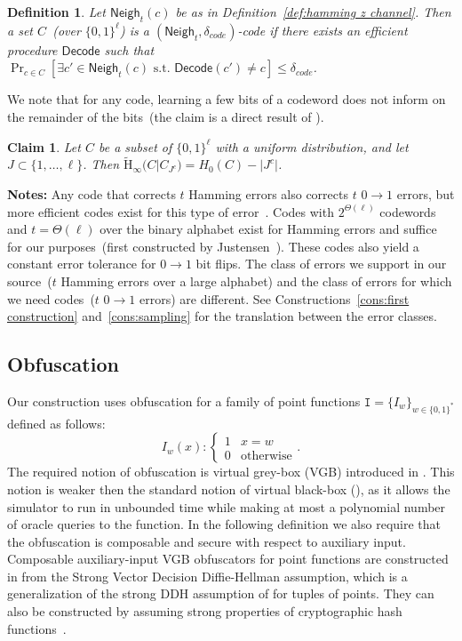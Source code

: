 \documentclass[11pt]{article}
\newcommand{\defref}[1]{\mbox{Definition~\ref{#1}}}
\newcommand{\class}[1]{{\ensuremath{\mathsf{#1}}}}
\newcommand{\zo}{\ensuremath{\{0, 1\}}}
\newcommand{\neigh}{\ensuremath{\class{Neigh}}\xspace}
\newcommand{\decode}{\ensuremath{\mathsf{Decode}}}
\newcommand{\Hav}{\tilde{\mathrm{H}}_\infty}
\newtheorem{definition}[theorem]{Definition}
\newtheorem{claim}[theorem]{Claim}
\begin{document}
\begin{definition}
Let $\neigh_t(c)$ be as in \defref{def:hamming z channel}.  Then a set $C$~(over $\zo^\ell$) is a $(\neigh_t, \delta_{code})$-code if there exists an efficient procedure $\decode$ such that $\Pr_{c\in C}[\exists c'\in \neigh_t(c) \text{ s.t. } \decode(c') \neq c] \leq \delta_{code}$.
\end{definition}

We note that for any code, learning a few bits of a codeword does not inform on the remainder of the bits~(the claim is a direct result of \cite[Lemma 2.2b]{DBLP:journals/siamcomp/DodisORS08}).

\begin{claim}
\label{cl:many locations ent}
Let $C$ be a subset of $\{0,1\}^\ell$ with a uniform distribution, and let $J\subset \{1,\dots,\ell\}$.  Then $\Hav(C | C_{J^c}) =  H_0(C) - |J^c|$.
\end{claim}

\textbf{Notes:}
Any code that corrects $t$ Hamming errors also corrects $t$ $0\rightarrow 1$ errors, but more efficient codes  exist for this type of error~\cite{tallini2002capacity}.
Codes with $2^{\Theta(\ell)}$ codewords and $t = \Theta(\ell)$ over the binary alphabet exist for Hamming errors and suffice for our purposes~(first constructed by Justensen~\cite{justesen1972class}).  These codes also yield a constant error tolerance for $0\rightarrow 1$ bit flips.
The class of errors we support in our source~($t$ Hamming errors over a large alphabet) and the class of errors for which we need codes~($t$ $0\rightarrow 1$ errors) are different.  See Constructions~\ref{cons:first construction} and~\ref{cons:sampling} for the translation between the error classes.

\subsection{Obfuscation}
Our construction uses obfuscation for a family of point functions $\mathtt{I} = \{I_w\}_{w \in \zo^*}$ defined as follows:
\[
I_w(x):\begin{cases} 1 & x=w\\0 & \text{otherwise}\end{cases}.
\]
The required notion of obfuscation is virtual grey-box (VGB) introduced in \cite{bitansky2010strong}. This notion is weaker then the standard notion of virtual black-box (\cite{barak2001possibility}), as it allows the simulator to run in unbounded time while making at most a polynomial number of oracle queries to the function. In the following definition we also require that the obfuscation is composable and secure with respect to auxiliary input. Composable auxiliary-input VGB obfuscators for point functions are constructed in \cite[Theorem 6.1]{bitansky2010strong} from the Strong Vector Decision Diffie-Hellman assumption, which is a generalization of the strong DDH assumption of \cite{canetti1997towards} for tuples of points. They can also be constructed by assuming strong properties of cryptographic hash functions~\cite{canetti1997towards}.
\end{document}
